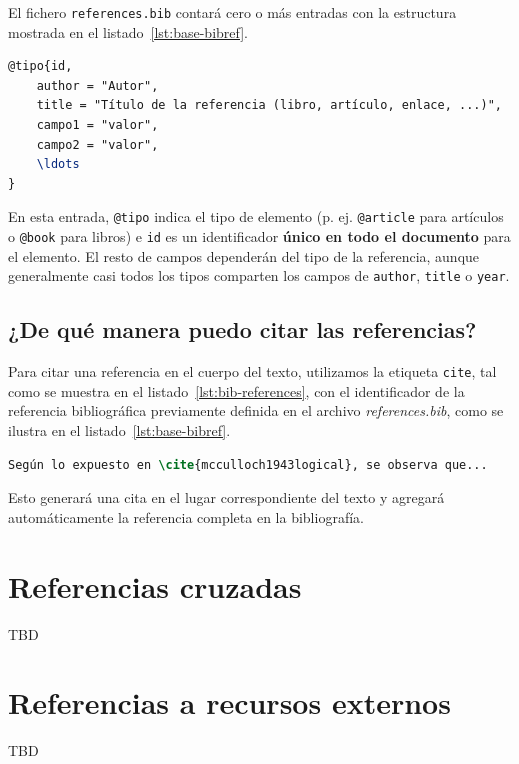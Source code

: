 El fichero \texttt{references.bib} contará cero o más entradas con la estructura mostrada en el listado~\ref{lst:base-bibref}.

\begin{lstlisting}[language=tex,caption=Estructura general de una referencia,label=lst:base-bibref]
@tipo{id,
    author = "Autor",
    title = "Título de la referencia (libro, artículo, enlace, ...)",
    campo1 = "valor",
    campo2 = "valor",
    \ldots
}
\end{lstlisting}

En esta entrada, \texttt{@tipo} indica el tipo de elemento (p. ej. \texttt{@article} para artículos o \texttt{@book} para libros) e \texttt{id} es un identificador \textbf{único en todo el documento} para el elemento. El resto de campos dependerán del tipo de la referencia, aunque generalmente casi todos los tipos comparten los campos de \texttt{author}, \texttt{title} o \texttt{year}.

\subsection{¿De qué manera puedo citar las referencias?}

Para citar una referencia en el cuerpo del texto, utilizamos la etiqueta \texttt{cite}, tal como se muestra en el listado~\ref{lst:bib-references}, con el identificador de la referencia bibliográfica previamente definida en el archivo \textit{references.bib}, como se ilustra en el listado~\ref{lst:base-bibref}.

\begin{lstlisting}[language=tex, caption=Referenciando una entrada bibliográfica,label={lst:bib-references},]
Según lo expuesto en \cite{mcculloch1943logical}, se observa que...
\end{lstlisting}

Esto generará una cita en el lugar correspondiente del texto y agregará automáticamente la referencia completa en la bibliografía.

\section{Referencias cruzadas}

TBD

\section{Referencias a recursos externos}

TBD
